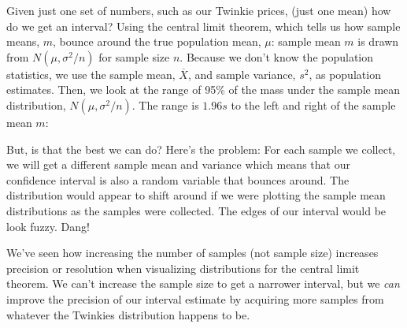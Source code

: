 \documentclass[titlepage]{tufte-book}
\newcounter{problem}
\begin{document}
\begin{fullwidth}
Given just one set of numbers, such as our Twinkie prices, (just one mean) how do we get an interval? Using the central limit theorem, which tells us how sample means, $m$, bounce around the true population mean, $\mu$: sample mean $m$ is drawn from $N(\mu, \sigma^2/n)$ for sample size $n$.  Because we don't know the population statistics, we use the sample mean, $\overline{X}$, and sample variance, $s^2$, as population estimates. Then, we look at the range of 95\% of the mass under the sample mean distribution, $N(\mu, \sigma^2/n)$.  The range is $1.96s$ to the left and right of the sample mean $m$: 
\begin{center}
\end{center}

But, is that the best we can do?  Here's the problem: For each sample we collect, we will get a different sample mean and variance which means that our confidence interval is also a random variable that bounces around. The distribution would appear to shift around if we were plotting the sample mean distributions as the samples were collected. The edges of our interval would be look fuzzy. Dang!

We've seen how increasing the number of samples (not sample size) increases precision or resolution when visualizing distributions for the central limit theorem. We can't increase the sample size to get a narrower interval, but we {\em can} improve the precision of our interval estimate by acquiring more samples from whatever the Twinkies distribution happens to be.


\end{fullwidth}
\end{document}
